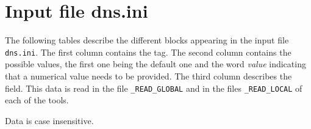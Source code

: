 \section{Input file dns.ini}

The following tables describe the different blocks appearing in the input file {\tt dns.ini}. The first column contains the tag. The second column contains the possible values, the first one being the default one and the word {\it value} indicating that a numerical value needs to be provided. The third column describes the field. This data is read in the file {\tt *\_READ\_GLOBAL} and in the files {\tt *\_READ\_LOCAL} of each of the tools.

Data is case insensitive.

